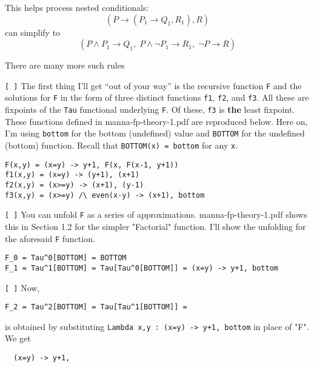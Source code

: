 \documentclass[11pt]{article}
\begin{document}
\begin{Large}
\begin{enumerate}
\begin{compactitem}
\begin{compactitem}
      \item This helps process nested conditionals:        \[(P \rightarrow (P_1\rightarrow Q_1,R_1), R) \]
        can simplify to
        \[ (P\wedge P_1 \rightarrow Q_1,
        \; P\wedge \neg P_1 \rightarrow R_1,
        \; \neg P \rightarrow R)
        \]
        
      \end{compactitem}

    \item There are many more such rules 
    \end{compactitem}
    
\item \verb|[ ]| \label{step2}
  The first thing I'll get ``out of your way'' is the recursive
  function {\tt F} and the solutions for {\tt F} in the form
  of three distinct functions {\tt f1}, {\tt f2}, and {\tt f3}.
  All these are fixpoints of the {\tt Tau}
  functional underlying
  {\tt F}.
  Of these, {\tt f3} is {\bf the} least fixpoint.
  These functions defined in manna-fp-theory-1.pdf are reproduced
  below.
  Here on, I'm using {\tt bottom} for the bottom (undefined)
  value and {\tt BOTTOM} for the undefined (bottom) function.
  Recall that {\tt BOTTOM(x) = bottom} for any {\tt x}.

\begin{verbatim}
F(x,y) = (x=y) -> y+1, F(x, F(x-1, y+1))
f1(x,y) = (x=y) -> (y+1), (x+1)
f2(x,y) = (x>=y) -> (x+1), (y-1)
f3(x,y) = (x>=y) /\ even(x-y) -> (x+1), bottom
  \end{verbatim}
  
\item \verb|[ ]| 
You can unfold {\tt F} as a series of approximations.
manna-fp-theory-1.pdf shows this in Section 1.2 for the simpler
"Factorial" function.
%
I'll show the unfolding for the aforesaid {\tt F} function.

\begin{verbatim}
F_0 = Tau^0[BOTTOM] = BOTTOM
F_1 = Tau^1[BOTTOM] = Tau[Tau^0[BOTTOM]] = (x=y) -> y+1, bottom
\end{verbatim}

\item \verb|[ ]| Now,
\begin{verbatim}  
F_2 = Tau^2[BOTTOM] = Tau[Tau^1[BOTTOM]] =
\end{verbatim}
is obtained by substituting {\tt Lambda x,y : (x=y) -> y+1, bottom}
in place of "F".
We get
\begin{footnotesize}
\begin{verbatim}  
  (x=y) -> y+1,


\end{verbatim}
\end{footnotesize}
\end{enumerate}
\end{Large}
\end{document}
